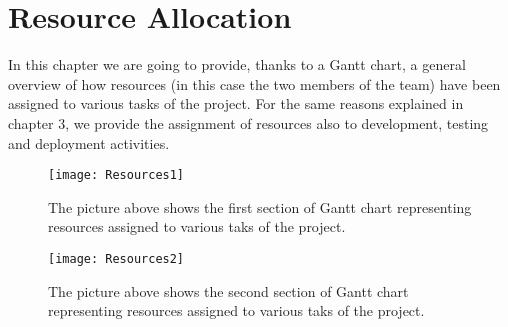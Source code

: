 \chapter{Resource Allocation}
In this chapter we are going to provide, thanks to a Gantt chart, a general overview of how resources (in this case the two members of the team) have been assigned to various tasks of the project. For the same reasons explained in chapter 3, we provide the assignment of resources also to development, testing and deployment activities.

\begin{figure}[H]
	\centering
	\texttt{[image: Resources1]}
	\caption[Resources-1]{The picture above shows the first section of Gantt chart representing resources assigned to various taks of the project.}
	\label{fig:Resources-1}
\end{figure}

\begin{figure}[H]
	\centering
	\texttt{[image: Resources2]}
	\caption[Resources-2]{The picture above shows the second section of Gantt chart representing resources assigned to various taks of the project.}
	\label{fig:Resources-2}
\end{figure}